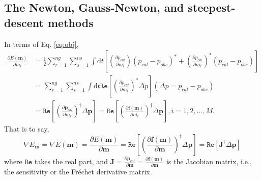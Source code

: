 \subsection{The Newton, Gauss-Newton, and steepest-descent methods}

In terms of Eq. \eqref{eq:obj},
\begin{equation}\label{eq:descent1}
\begin{split}
\frac{\partial E(\textbf{m})}{\partial m_i}
&=\frac{1}{2}\sum_{r=1}^{ng}\sum_{s=1}^{ns}\int \mathrm{d}t\left[\left(\frac{\partial p_{cal}}{\partial m_i}\right)(p_{cal}-p_{obs})^*+
\left(\frac{\partial p_{cal}}{\partial m_i}\right)^*(p_{cal}-p_{obs})\right]\\
&=\sum_{r=1}^{ng}\sum_{s=1}^{ns}\int \mathrm{d}t\mathtt{Re} \left[\left(\frac{\partial p_{cal}}{\partial m_i}\right)^*\Delta p\right] (\Delta p=p_{cal}-p_{obs})\\
&=\mathtt{Re}\left[\left(\frac{\partial \textbf{p}_{cal}}{\partial m_i}\right)^{\dagger}\Delta \textbf{p}\right]
=\mathtt{Re}\left[\left(\frac{\partial \textbf{f}(\textbf{m})}{\partial m_i}\right)^{\dagger}\Delta \textbf{p}\right], 
i=1,2,\ldots,M.
\end{split}
\end{equation}
That is to say,
\begin{equation}\label{eq:grad}
\nabla E_{\textbf{m}}=\nabla E(\textbf{m})=\frac{\partial E(\textbf{m})}{\partial \textbf{m}}
=\mathtt{Re}\left[\left(\frac{\partial \textbf{f}(\textbf{m})}{\partial \textbf{m}}\right)^{\dagger}\Delta \textbf{p}\right]
=\mathtt{Re}\left[\textbf{J}^{\dagger}\Delta \textbf{p}\right]
\end{equation}
where $\mathtt{Re}$ takes the real part, and $\textbf{J}=\frac{\partial \textbf{p}_{cal}}{\partial \textbf{m}}=\frac{\partial \textbf{f}(\textbf{m})}{\partial \textbf{m}}$ is the Jacobian matrix, i.e., the sensitivity or the Fréchet derivative matrix.


